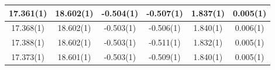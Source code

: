 \documentclass[a4paper,11pt]{article}
\begin{document}
\begin{table}[t]
\begin{tabular}{|c|c|c|c|c|c|}
                    \hline
                    17.361(1) & 18.602(1) & -0.504(1) & -0.507(1) & 1.837(1) & 0.005(1)\\
                    \hline
                    17.368(1) & 18.602(1) & -0.503(1) & -0.506(1) & 1.840(1) & 0.006(1)\\
                    \hline
                    17.388(1) & 18.602(1) & -0.503(1) & -0.511(1) & 1.832(1) & 0.005(1)\\
                    \hline
                    17.373(1) & 18.601(1) & -0.503(1) & -0.509(1) & 1.840(1) & 0.005(1)\\
                    \hline
                \end{tabular}
                \captionsetup{justification=centering, font=footnotesize}
                \vspace{10pt}
            \end{table}
\end{document}
